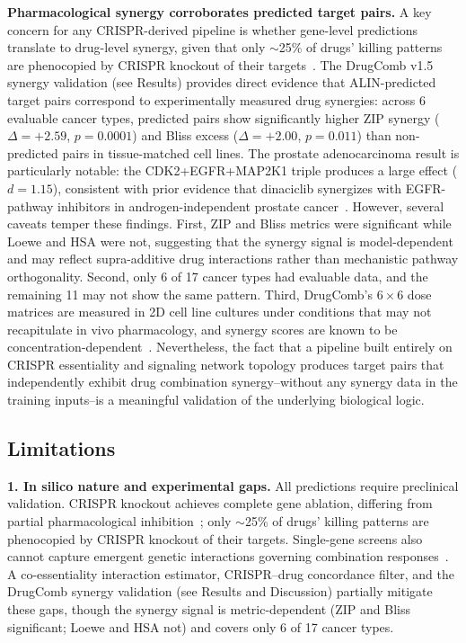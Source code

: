\documentclass[times, twoside, watermark]{zHenriquesLab-StyleBioRxiv}
\begin{document}
\textbf{Pharmacological synergy corroborates predicted target pairs.} A key concern for any CRISPR-derived pipeline is whether gene-level predictions translate to drug-level synergy, given that only $\sim$25\% of drugs' killing patterns are phenocopied by CRISPR knockout of their targets~\cite{Lin2017,Goncalves2020}. The DrugComb v1.5 synergy validation (see Results) provides direct evidence that ALIN-predicted target pairs correspond to experimentally measured drug synergies: across 6 evaluable cancer types, predicted pairs show significantly higher ZIP synergy ($\Delta = +2.59$, $p = 0.0001$) and Bliss excess ($\Delta = +2.00$, $p = 0.011$) than non-predicted pairs in tissue-matched cell lines. The prostate adenocarcinoma result is particularly notable: the CDK2+EGFR+MAP2K1 triple produces a large effect ($d = 1.15$), consistent with prior evidence that dinaciclib synergizes with EGFR-pathway inhibitors in androgen-independent prostate cancer~\cite{Nabhan2009}. However, several caveats temper these findings. First, ZIP and Bliss metrics were significant while Loewe and HSA were not, suggesting that the synergy signal is model-dependent and may reflect supra-additive drug interactions rather than mechanistic pathway orthogonality. Second, only 6 of 17 cancer types had evaluable data, and the remaining 11 may not show the same pattern. Third, DrugComb's $6 \times 6$ dose matrices are measured in 2D cell line cultures under conditions that may not recapitulate in vivo pharmacology, and synergy scores are known to be concentration-dependent~\cite{Zagidullin2019}. Nevertheless, the fact that a pipeline built entirely on CRISPR essentiality and signaling network topology produces target pairs that independently exhibit drug combination synergy--without any synergy data in the training inputs--is a meaningful validation of the underlying biological logic.

\subsection*{Limitations}

\textbf{1. In silico nature and experimental gaps.} All predictions require preclinical validation. CRISPR knockout achieves complete gene ablation, differing from partial pharmacological inhibition~\cite{Lin2017,Goncalves2020}; only $\sim$25\% of drugs' killing patterns are phenocopied by CRISPR knockout of their targets. Single-gene screens also cannot capture emergent genetic interactions governing combination responses~\cite{Norman2019,Shen2017combCRISPR}. A co-essentiality interaction estimator, CRISPR--drug concordance filter, and the DrugComb synergy validation (see Results and Discussion) partially mitigate these gaps, though the synergy signal is metric-dependent (ZIP and Bliss significant; Loewe and HSA not) and covers only 6 of 17 cancer types.
\end{document}
